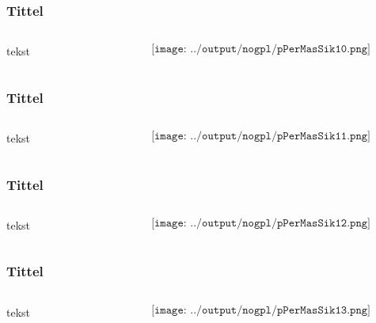 \documentclass[aspectratio=169,xcolor=dvipsnames]{beamer}
\begin{document}
\begin{frame}
	\frametitle{Tittel}
	\begin{columns}
		\begin{column}{0.5\textwidth}
tekst
			
		\end{column}

		\begin{column}{0.5\textwidth}
	$$\texttt{[image: ../output/nogpl/pPerMasSik10.png]}$$
		\end{column}
	\end{columns}
\end{frame}

\begin{frame}
	\frametitle{Tittel}
	\begin{columns}
		\begin{column}{0.5\textwidth}
tekst
			
		\end{column}

		\begin{column}{0.5\textwidth}
	$$\texttt{[image: ../output/nogpl/pPerMasSik11.png]}$$
		\end{column}
	\end{columns}
\end{frame}

\begin{frame}
	\frametitle{Tittel}
	\begin{columns}
		\begin{column}{0.5\textwidth}
tekst
			
		\end{column}

		\begin{column}{0.5\textwidth}
	$$\texttt{[image: ../output/nogpl/pPerMasSik12.png]}$$
		\end{column}
	\end{columns}
\end{frame}

\begin{frame}
	\frametitle{Tittel}
	\begin{columns}
		\begin{column}{0.5\textwidth}
tekst
			
		\end{column}

		\begin{column}{0.5\textwidth}
	$$\texttt{[image: ../output/nogpl/pPerMasSik13.png]}$$
		\end{column}
	\end{columns}
\end{frame}
\end{document}
